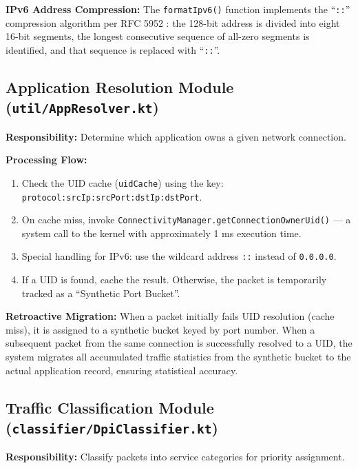 \textbf{IPv6 Address Compression:}
The \texttt{formatIpv6()} function implements the ``\texttt{::}'' compression algorithm per RFC 5952 \cite{rfc5952}: the 128-bit address is divided into eight 16-bit segments, the longest consecutive sequence of all-zero segments is identified, and that sequence is replaced with ``\texttt{::}''.

\subsection{Application Resolution Module (\texttt{util/AppResolver.kt})}

\textbf{Responsibility:} Determine which application owns a given network connection.

\textbf{Processing Flow:}
\begin{enumerate}
    \item Check the UID cache (\texttt{uidCache}) using the key: \texttt{protocol:srcIp:srcPort:dstIp:dstPort}.
    \item On cache miss, invoke \texttt{ConnectivityManager.getConnectionOwnerUid()} --- a system call to the kernel with approximately 1 ms execution time.
    \item Special handling for IPv6: use the wildcard address \texttt{::} instead of \texttt{0.0.0.0}.
    \item If a UID is found, cache the result. Otherwise, the packet is temporarily tracked as a ``Synthetic Port Bucket''.
\end{enumerate}

\textbf{Retroactive Migration:} When a packet initially fails UID resolution (cache miss), it is assigned to a synthetic bucket keyed by port number. When a subsequent packet from the same connection is successfully resolved to a UID, the system migrates all accumulated traffic statistics from the synthetic bucket to the actual application record, ensuring statistical accuracy.

\subsection{Traffic Classification Module (\texttt{classifier/DpiClassifier.kt})}

\textbf{Responsibility:} Classify packets into service categories for priority assignment.

